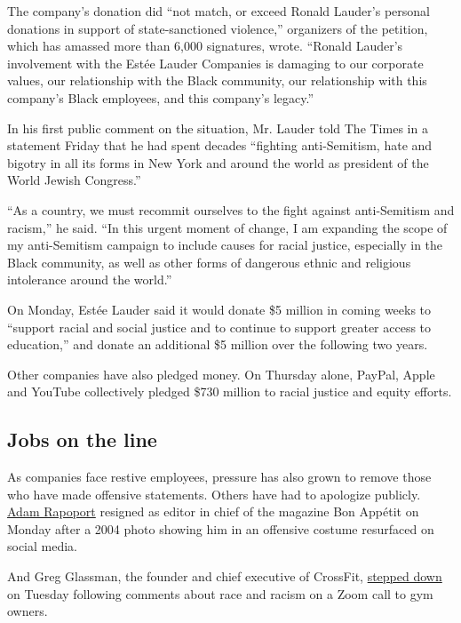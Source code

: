 The company's donation did ``not match, or exceed Ronald Lauder's
personal donations in support of state-sanctioned violence,'' organizers
of the petition, which has amassed more than 6,000 signatures, wrote.
``Ronald Lauder's involvement with the Estée Lauder Companies is
damaging to our corporate values, our relationship with the Black
community, our relationship with this company's Black employees, and
this company's legacy.''

In his first public comment on the situation, Mr. Lauder told The Times
in a statement Friday that he had spent decades ``fighting
anti-Semitism, hate and bigotry in all its forms in New York and around
the world as president of the World Jewish Congress.''

``As a country, we must recommit ourselves to the fight against
anti-Semitism and racism,'' he said. ``In this urgent moment of change,
I am expanding the scope of my anti-Semitism campaign to include causes
for racial justice, especially in the Black community, as well as other
forms of dangerous ethnic and religious intolerance around the world.''

On Monday, Estée Lauder said it would donate \$5 million in coming weeks
to ``support racial and social justice and to continue to support
greater access to education,'' and donate an additional \$5 million over
the following two years.

Other companies have also pledged money. On Thursday alone, PayPal,
Apple and YouTube collectively pledged \$730 million to racial justice
and equity efforts.

\hypertarget{jobs-on-the-line}{%
\subsection{Jobs on the line}\label{jobs-on-the-line}}

As companies face restive employees, pressure has also grown to remove
those who have made offensive statements. Others have had to apologize
publicly.
\href{https://www.nytimes.com/2020/06/08/dining/bon-appetit-adam-rapoport.html}{Adam
Rapoport} resigned as editor in chief of the magazine Bon Appétit on
Monday after a 2004 photo showing him in an offensive costume resurfaced
on social media.

And Greg Glassman, the founder and chief executive of CrossFit,
\href{https://www.nytimes.com/2020/06/09/style/crossfit-gyms-founder-protests.html}{stepped
down} on Tuesday following comments about race and racism on a Zoom call
to gym owners.

